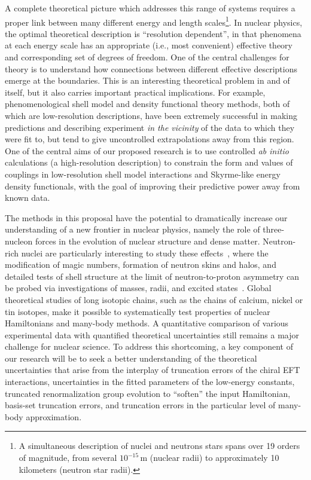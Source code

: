 A complete theoretical picture which addresses this range of systems
requires a proper link between many different energy and length
scales\footnote{A simultaneous description of nuclei and neutrons
stars spans over 19 orders of magnitude, from several $10^{-15}$\,m
(nuclear radii) to approximately 10 kilometers (neutron star radii).}.
In nuclear physics, the optimal theoretical description is
``resolution dependent'', in that phenomena at each energy scale has
an appropriate (i.e., most convenient) effective theory and
corresponding set of degrees of freedom. One of the central challenges
for theory is to understand how connections between different
effective descriptions emerge at the boundaries.  This is an
interesting theoretical problem in and of itself, but it also carries
important practical implications. For example, phenomenological shell
model and density functional theory methods, both of which are
low-resolution descriptions, have been extremely successful in making
predictions and describing experiment \emph{in the vicinity} of the
data to which they were fit to, but tend to give uncontrolled
extrapolations away from this region.  One of the central aims of our
proposed research is to use controlled \emph{ab initio} calculations
(a high-resolution description) to constrain the form and values of
couplings in low-resolution shell model interactions and Skyrme-like
energy density functionals, with the goal of improving their
predictive power away from known data.


The methods in this proposal have the potential to
dramatically increase our understanding of a new frontier in nuclear
physics, namely the role of three-nucleon forces in the evolution
of nuclear structure and dense matter. Neutron-rich nuclei are particularly interesting
to study these effects~\cite{Otsuka:2009cs,Holt:2011fj,Holt:2014aya}, where
the modification of magic numbers, formation of neutron skins and
halos, and detailed tests of shell structure at the limit of
neutron-to-proton asymmetry can be probed via investigations of
masses, radii, and excited states~\cite{Wienholtz:2013bh,Hagen:2015ve,jansenprl2016}. Global theoretical
studies of long isotopic chains, such as the chains of calcium, nickel or
tin isotopes, make it possible to systematically test properties of
nuclear Hamiltonians and many-body methods.  A quantitative
comparison of various experimental data with quantified theoretical
uncertainties still remains a major challenge for nuclear science. To
address this shortcoming, a key component of our research will
be to seek a better understanding of the theoretical uncertainties
that arise from the interplay of truncation errors of the chiral EFT interactions, uncertainties in the
fitted parameters of the low-energy constants, truncated renormalization
group evolution to ``soften'' the input Hamiltonian, basis-set
truncation errors, and truncation errors in the particular level of
many-body approximation.

